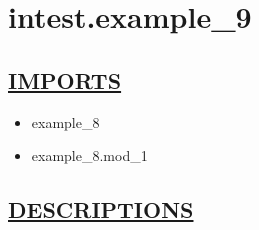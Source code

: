 \chapter*{intest.example\_9}

\section*{\underline{IMPORTS}}
\begin{itemize}
\item example\_8
\item example\_8.mod\_1
\end{itemize}

\section*{\underline{DESCRIPTIONS}}
